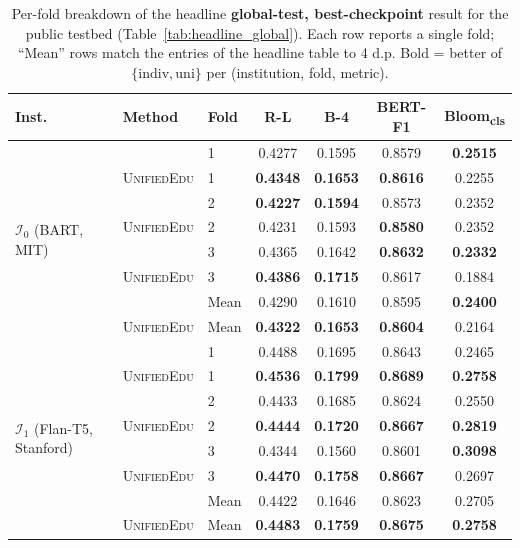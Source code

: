 \documentclass[11pt]{article}
\theoremstyle{plain}
\theoremstyle{definition}
\theoremstyle{remark}
\newcommand{\UniEdu}{\textsc{UnifiedEdu}}
\newcommand{\indiv}{\text{indiv}}
\newcommand{\uni}{\text{uni}}
\begin{document}
\begin{table}[t]
\centering
\footnotesize
\setlength{\tabcolsep}{3pt}
\caption{Per-fold breakdown of the headline
\textbf{global-test, best-checkpoint} result for the
public testbed (Table~\ref{tab:headline_global}).
Each row reports a single fold; ``Mean'' rows match
the entries of the headline table to 4 d.p. Bold =
better of $\{\indiv, \uni\}$ per (institution, fold,
metric).}
\label{tab:appendix_perfold_global_best}
\begin{tabular}{ll l cccc}
\toprule
\textbf{Inst.} & \textbf{Method} & \textbf{Fold} &
\textbf{R-L} & \textbf{B-4} & \textbf{BERT-F1} & \textbf{Bloom\textsubscript{cls}} \\
\midrule
\multirow{8}{*}{$\mathcal{I}_0$ (BART, MIT)}
  & \indiv    & 1     & 0.4277 & 0.1595 & 0.8579 & \textbf{0.2515} \\
  & \UniEdu{} & 1     & \textbf{0.4348} & \textbf{0.1653} & \textbf{0.8616} & 0.2255 \\
  & \indiv    & 2     & \textbf{0.4227} & \textbf{0.1594} & 0.8573 & 0.2352 \\
  & \UniEdu{} & 2     & 0.4231 & 0.1593 & \textbf{0.8580} & 0.2352 \\
  & \indiv    & 3     & 0.4365 & 0.1642 & \textbf{0.8632} & \textbf{0.2332} \\
  & \UniEdu{} & 3     & \textbf{0.4386} & \textbf{0.1715} & 0.8617 & 0.1884 \\
  & \indiv    & Mean  & 0.4290 & 0.1610 & 0.8595 & \textbf{0.2400} \\
  & \UniEdu{} & Mean  & \textbf{0.4322} & \textbf{0.1653} & \textbf{0.8604} & 0.2164 \\
\midrule
\multirow{8}{*}{$\mathcal{I}_1$ (Flan-T5, Stanford)}
  & \indiv    & 1     & 0.4488 & 0.1695 & 0.8643 & 0.2465 \\
  & \UniEdu{} & 1     & \textbf{0.4536} & \textbf{0.1799} & \textbf{0.8689} & \textbf{0.2758} \\
  & \indiv    & 2     & 0.4433 & 0.1685 & 0.8624 & 0.2550 \\
  & \UniEdu{} & 2     & \textbf{0.4444} & \textbf{0.1720} & \textbf{0.8667} & \textbf{0.2819} \\
  & \indiv    & 3     & 0.4344 & 0.1560 & 0.8601 & \textbf{0.3098} \\
  & \UniEdu{} & 3     & \textbf{0.4470} & \textbf{0.1758} & \textbf{0.8667} & 0.2697 \\
  & \indiv    & Mean  & 0.4422 & 0.1646 & 0.8623 & 0.2705 \\
  & \UniEdu{} & Mean  & \textbf{0.4483} & \textbf{0.1759} & \textbf{0.8675} & \textbf{0.2758} \\

\end{tabular}
\end{table}
\end{document}
